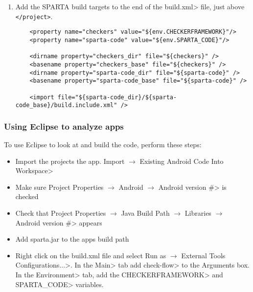 \begin{enumerate}
\item
Add the SPARTA build targets to the end of the \<build.xml>
 file, just above \verb|</project>|.


\begin{Verbatim}
    <property name="checkers" value="${env.CHECKERFRAMEWORK}"/>
    <property name="sparta-code" value="${env.SPARTA_CODE}"/>

    <dirname property="checkers_dir" file="${checkers}" />
    <basename property="checkers_base" file="${checkers}" />
    <dirname property="sparta-code_dir" file="${sparta-code}" />
    <basename property="sparta-code_base" file="${sparta-code}" />

    <import file="${sparta-code_dir}/${sparta-code_base}/build.include.xml" />
\end{Verbatim}

\end{enumerate}

\subsubsection{Using Eclipse to analyze apps}
To use Eclipse to look at and build the code, perform these 
steps:
\begin{itemize}
\item
Import the projects the app.      \<Import $\rightarrow$ Existing Android Code 
Into Workspace>

    \item
    Make sure
    \<Project Properties $\rightarrow$ Android $\rightarrow$ Android
    version \#> is checked

    \item
    Check that
    \<Project Properties $\rightarrow$ Java Build Path $\rightarrow$
    Libraries $\rightarrow$ Android version \#> appears

    \item
    Add sparta.jar to the apps build path
    
    \item Right click on the build.xml file and select   \<Run as $\rightarrow$ 
    External Tools Configurations...>. In the \<Main> tab add \<check-flow> to the 
    Arguments box.  In the \<Environment> tab, add the \<CHECKERFRAMEWORK> and 
    \<SPARTA\_CODE> variables.  
    
  \end{itemize}






